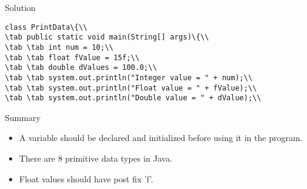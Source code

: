 \documentclass[aspectratio=169,14pt,usenames,dvipsnames]{beamer}
\newcommand\tab[1][1cm]{\hspace*{#1}}
\begin{document}
\begin{frame}{Solution}
\begin{lstlisting}
class PrintData\{\\
\tab public static void main(String[] args)\{\\
\tab \tab int num = 10;\\
\tab \tab float fValue = 15f;\\
\tab \tab double dValues = 100.0;\\
\tab \tab system.out.println("Integer value = " + num);\\
\tab \tab system.out.println("Float value = " + fValue);\\
\tab \tab system.out.println("Double value = " + dValue);\\
\end{lstlisting}
\end{frame}


\begin{frame}{Summary}
\begin{itemize}
    \item A variable should be declared and initialized before using it in the program.
    \item There are 8 primitive data types in Java.
    \item Float values should have post fix 'f'.
    
\end{itemize}
\end{frame}
\end{document}
